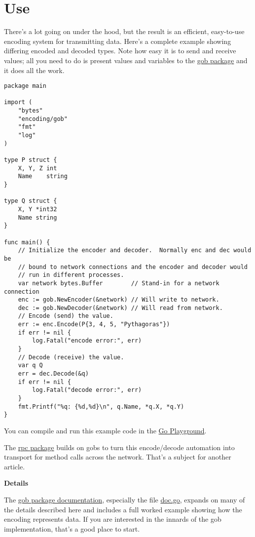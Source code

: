 \section*{Use}

There's a lot going on under the hood, but the result is an efficient,
easy-to-use encoding system for transmitting data. Here's a complete
example showing differing encoded and decoded types. Note how easy it is
to send and receive values; all you need to do is present values and
variables to the \href{http://golang.org/pkg/encoding/gob/}{gob package} and it does all
the work.

\begin{Verbatim}[frame=single]
package main

import (
	"bytes"
	"encoding/gob"
	"fmt"
	"log"
)

type P struct {
	X, Y, Z int
	Name    string
}

type Q struct {
	X, Y *int32
	Name string
}

func main() {
	// Initialize the encoder and decoder.  Normally enc and dec would be
	// bound to network connections and the encoder and decoder would
	// run in different processes.
	var network bytes.Buffer        // Stand-in for a network connection
	enc := gob.NewEncoder(&network) // Will write to network.
	dec := gob.NewDecoder(&network) // Will read from network.
	// Encode (send) the value.
	err := enc.Encode(P{3, 4, 5, "Pythagoras"})
	if err != nil {
		log.Fatal("encode error:", err)
	}
	// Decode (receive) the value.
	var q Q
	err = dec.Decode(&q)
	if err != nil {
		log.Fatal("decode error:", err)
	}
	fmt.Printf("%q: {%d,%d}\n", q.Name, *q.X, *q.Y)
}
\end{Verbatim}

You can compile and run this example code in the
\href{http://play.golang.org/p/\_-OJV-rwMq}{Go Playground}.

The \href{http://golang.org/pkg/net/rpc/}{rpc package} builds on
gobs to turn this encode/decode automation into transport for method
calls across the network. That's a subject for another article.

\textbf{Details}

The \href{http://golang.org/pkg/encoding/gob/}{gob package
documentation}, especially the file
\href{http://golang.org/src/pkg/encoding/gob/doc.go}{doc.go}, expands
on many of the details described here and includes a full worked
example showing how the encoding represents data. If you are
interested in the innards of the gob implementation, that's a good
place to start.
